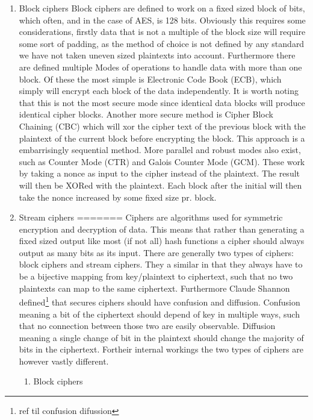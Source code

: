 \documentclass[a4paper]{article}
\begin{document}
\begin{enumerate}
\item Block ciphers
\label{sec:org77591e2}
Block ciphers are defined to work on a fixed sized block of bits, which often, and in the case of AES, is 128 bits. Obviously this requires some considerations, firstly data that is not a multiple of the block size will require some sort of padding, as the method of choice is not defined by any standard we have not taken uneven sized plaintexts into account. Furthermore there are defined multiple Modes of operations to handle data with more than one block. Of these the most simple is Electronic Code Book (ECB), which simply will encrypt each block of the data independently. It is worth noting that this is not the most secure mode since identical data blocks will produce identical cipher blocks. Another more secure method is Cipher Block Chaining (CBC) which will xor the cipher text of the previous block with the plaintext of the current block before encrypting the block. This approach is a embarrisingly sequential method. More parallel and robust modes also exist, such as Counter Mode (CTR) and Galois Counter Mode (GCM). These work by taking a nonce as input to the cipher instead of the plaintext. The result will then be XORed with the plaintext. Each block after the initial will then take the nonce increased by some fixed size pr. block.
\item Stream ciphers
\label{sec:org8c111b7}
=======
\label{sec:org52740b0}
Ciphers are algorithms used for symmetric encryption and decryption of data. This means that rather than generating a fixed sized output like most (if not all) hash functions a cipher should always output as many bits as its input. There are generally two types of ciphers: block ciphers and stream ciphers. They a similar in that they always have to be a bijective mapping from key/plaintext to ciphertext, such that no two plaintexts can map to the same ciphertext. Furthermore Claude Shannon defined\footnote{ref til confusion difussion} that secures ciphers should have confusion and diffusion. Confusion meaning a bit of the ciphertext should depend of key in multiple ways, such that no connection between those two are easily observable. Diffusion meaning a single change of bit in the plaintext should change the majority of bits in the ciphertext. Fortheir internal workings the two types of ciphers are however vastly different.
\begin{enumerate}
\item Block ciphers
\label{sec:orgbce534a}

\end{enumerate}
\end{enumerate}
\end{document}
